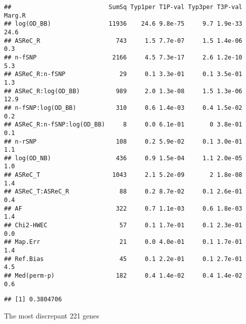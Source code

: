 \documentclass[]{article}
\newenvironment{Shaded}{\begin{snugshade}}{\end{snugshade}}
\newcommand{\KeywordTok}[1]{\textcolor[rgb]{0.13,0.29,0.53}{\textbf{#1}}}
\newcommand{\DataTypeTok}[1]{\textcolor[rgb]{0.13,0.29,0.53}{#1}}
\newcommand{\StringTok}[1]{\textcolor[rgb]{0.31,0.60,0.02}{#1}}
\newcommand{\OperatorTok}[1]{\textcolor[rgb]{0.81,0.36,0.00}{\textbf{#1}}}
\newcommand{\NormalTok}[1]{#1}
\begin{document}
\begin{verbatim}
##                           SumSq Typ1per T1P-val Typ3per T3P-val Marg.R
## log(OD_BB)                11936    24.6 9.8e-75     9.7 1.9e-33   24.6
## ASReC_R                     743     1.5 7.7e-07     1.5 1.4e-06    0.3
## n-fSNP                     2166     4.5 7.3e-17     2.6 1.2e-10    5.3
## ASReC_R:n-fSNP               29     0.1 3.3e-01     0.1 3.5e-01    1.3
## ASReC_R:log(OD_BB)          989     2.0 1.3e-08     1.5 1.3e-06   12.9
## n-fSNP:log(OD_BB)           310     0.6 1.4e-03     0.4 1.5e-02    0.2
## ASReC_R:n-fSNP:log(OD_BB)     8     0.0 6.1e-01       0 3.8e-01    0.1
## n-rSNP                      108     0.2 5.9e-02     0.1 3.0e-01    1.1
## log(OD_NB)                  436     0.9 1.5e-04     1.1 2.0e-05    1.0
## ASReC_T                    1043     2.1 5.2e-09       2 1.8e-08    1.4
## ASReC_T:ASReC_R              88     0.2 8.7e-02     0.1 2.6e-01    0.4
## AF                          322     0.7 1.1e-03     0.6 1.8e-03    1.4
## Chi2-HWEC                    57     0.1 1.7e-01     0.1 2.3e-01    0.0
## Map.Err                      21     0.0 4.0e-01     0.1 1.7e-01    1.4
## Ref.Bias                     45     0.1 2.2e-01     0.1 2.7e-01    4.5
## Med(perm-p)                 182     0.4 1.4e-02     0.4 1.4e-02    0.6
\end{verbatim}

\begin{Shaded}
\end{Shaded}

\begin{verbatim}
## [1] 0.3804706
\end{verbatim}

\begin{Shaded}
\end{Shaded}

The most discrepant 221 genes
\end{document}
